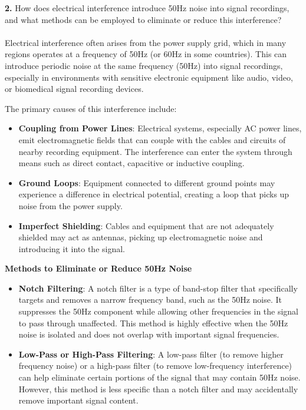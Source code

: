 \documentclass[hidelinks,12pt]{article}
\begin{document}
	
	 \textbf{2.} How does electrical interference introduce 50Hz noise into signal recordings, and what methods can be employed to eliminate or reduce this interference?
	\\ \\
	Electrical interference often arises from the power supply grid, which in many regions operates at a frequency of 50Hz (or 60Hz in some countries). This can introduce periodic noise at the same frequency (50Hz) into signal recordings, especially in environments with sensitive electronic equipment like audio, video, or biomedical signal recording devices.
	
	\pagebreak
	
	 The primary causes of this interference include:
	
	\begin{itemize}
		\item \textbf{Coupling from Power Lines}: Electrical systems, especially AC power lines, emit electromagnetic fields that can couple with the cables and circuits of nearby recording equipment. The interference can enter the system through means such as direct contact, capacitive or inductive coupling.
		\item \textbf{Ground Loops}: Equipment connected to different ground points may experience a difference in electrical potential, creating a loop that picks up noise from the power supply.
		\item \textbf{Imperfect Shielding}: Cables and equipment that are not adequately shielded may act as antennas, picking up electromagnetic noise and introducing it into the signal.
	\end{itemize}
	
	
	 \textbf{Methods to Eliminate or Reduce 50Hz Noise}
	
	\begin{itemize}
		\item \textbf{Notch Filtering}: A notch filter is a type of band-stop filter that specifically targets and removes a narrow frequency band, such as the 50Hz noise. It suppresses the 50Hz component while allowing other frequencies in the signal to pass through unaffected. This method is highly effective when the 50Hz noise is isolated and does not overlap with important signal frequencies.
		\item \textbf{Low-Pass or High-Pass Filtering}: A low-pass filter (to remove higher frequency noise) or a high-pass filter (to remove low-frequency interference) can help eliminate certain portions of the signal that may contain 50Hz noise. However, this method is less specific than a notch filter and may accidentally remove important signal content.
	\end{itemize}
	
\end{document}
